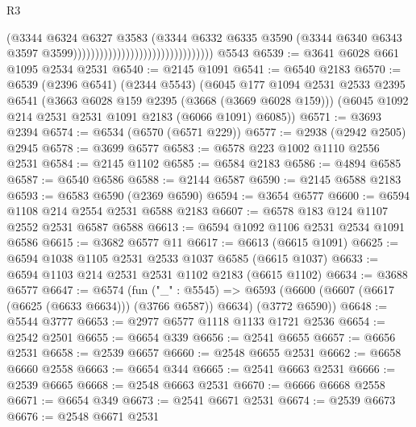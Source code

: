 \begin{lexlean}{R3}
\begin{coremodule}
                                                              (@3344
                                                                @6324
                                                                @6327
                                                                @3583
                                                                (@3344
                                                                  @6332
                                                                  @6335
                                                                  @3590
                                                                  (@3344
                                                                    @6340
                                                                    @6343
                                                                    @3597
                                                                    @3599))))))))))))))))))))))))))))))))
    @5543
@6539 := @3641 @6028 @661 @1095 @2534 @2531
@6540 := @2145 @1091
@6541 := @6540 @2183
@6570 := @6539
    (@2396 @6541)
    (@2344 @5543)
    (@6045
      @177
      @1094
      @2531
      @2533
      @2395
      @6541
      (@3663 @6028 @159 @2395 (@3668 (@3669 @6028 @159)))
      (@6045 @1092 @214 @2531 @2531 @1091 @2183 (@6066 @1091) @6085))
@6571 := @3693 @2394
@6574 := @6534 (@6570 (@6571 @229))
@6577 := @2938 (@2942 @2505) @2945
@6578 := @3699 @6577
@6583 := @6578 @223 @1002 @1110 @2556 @2531
@6584 := @2145 @1102
@6585 := @6584 @2183
@6586 := @4894 @6585
@6587 := @6540 @6586
@6588 := @2144 @6587
@6590 := @2145 @6588 @2183
@6593 := @6583 @6590 (@2369 @6590)
@6594 := @3654 @6577
@6600 := @6594 @1108 @214 @2554 @2531 @6588 @2183
@6607 := @6578 @183 @124 @1107 @2552 @2531 @6587 @6588
@6613 := @6594 @1092 @1106 @2531 @2534 @1091 @6586
@6615 := @3682 @6577 @11
@6617 := @6613 (@6615 @1091)
@6625 := @6594 @1038 @1105 @2531 @2533 @1037 @6585 (@6615 @1037)
@6633 := @6594 @1103 @214 @2531 @2531 @1102 @2183 (@6615 @1102)
@6634 := @3688 @6577
@6647 := @6574
    (fun ("_" : @5545) =>
    @6593 (@6600 (@6607 (@6617 (@6625 (@6633 @6634))) (@3766 @6587)) @6634) (@3772 @6590))
@6648 := @5544 @3777
@6653 := @2977 @6577 @1118 @1133 @1721 @2536
@6654 := @2542 @2501
@6655 := @6654 @339
@6656 := @2541 @6655
@6657 := @6656 @2531
@6658 := @2539 @6657
@6660 := @2548 @6655 @2531
@6662 := @6658 @6660 @2558
@6663 := @6654 @344
@6665 := @2541 @6663 @2531
@6666 := @2539 @6665
@6668 := @2548 @6663 @2531
@6670 := @6666 @6668 @2558
@6671 := @6654 @349
@6673 := @2541 @6671 @2531
@6674 := @2539 @6673
@6676 := @2548 @6671 @2531

\end{coremodule}
\end{lexlean}
